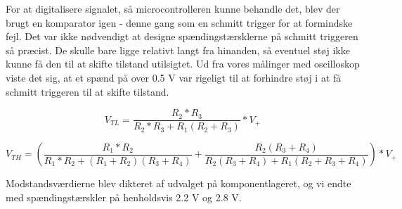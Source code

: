 For at digitalisere signalet, så microcontrolleren kunne behandle det, blev der brugt en komparator igen - denne gang som en schmitt trigger for at formindske fejl. Det var ikke nødvendigt at designe spændingstærsklerne på schmitt triggeren så præcist. De skulle bare ligge relativt langt fra hinanden, så eventuel støj ikke kunne få den til at skifte tilstand utilsigtet. Ud fra vores målinger med oscilloskop viste det sig, at et spænd på over 0.5 V var rigeligt til at forhindre støj i at få schmitt triggeren til at skifte tilstand.

\begin{equation}
V_{TL} = \dfrac{R_{2}*R_{3}}{R_{2}*R_{3}+R_{1}(R_{2}+R_{3})}*V_{+}
\end{equation}

\begin{equation}
V_{TH} = \left(\dfrac{R_{1}*R_{2}}{R_{1}*R_{2}+(R_{1}+R_{2})(R_{3}+R_{4})} + \dfrac{R_{2}(R_{3}+R_{4})}{R_{2}(R_{3}+R_{4})+R_{1}(R_{2}+R_{3}+R_{4})}\right)*V_{+}
\end{equation}


Modstandsværdierne blev dikteret af udvalget på komponentlageret, og vi endte med spændingstærskler på henholdsvis 2.2 V og 2.8 V.